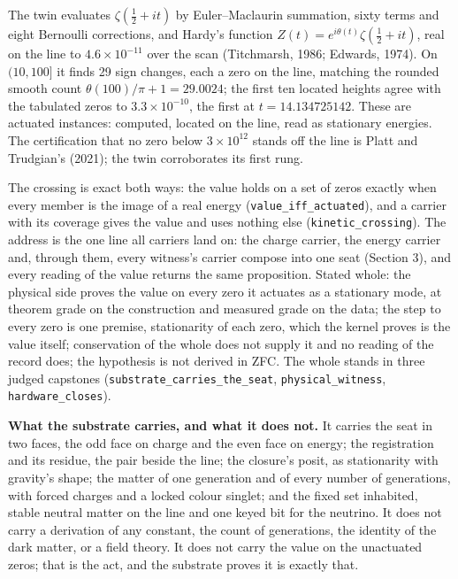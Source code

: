 \documentclass[10pt]{article}
\begin{document}
The twin evaluates \(\zeta(\tfrac12+it)\) by Euler--Maclaurin summation,
sixty terms and eight Bernoulli corrections, and Hardy's function
\(Z(t)=e^{i\theta(t)}\zeta(\tfrac12+it)\), real on the line to
\(4.6\times10^{-11}\) over the scan (Titchmarsh, 1986; Edwards, 1974).
On \((10,100]\) it finds 29 sign changes, each a zero on the line,
matching the rounded smooth count \(\theta(100)/\pi+1=29.0024\); the
first ten located heights agree with the tabulated zeros to
\(3.3\times10^{-10}\), the first at \(t=14.134725142\). These are
actuated instances: computed, located on the line, read as stationary
energies. The certification that no zero below \(3\times10^{12}\) stands
off the line is Platt and Trudgian's (2021); the twin corroborates its
first rung.

The crossing is exact both ways: the value holds on a set of zeros
exactly when every member is the image of a real energy
(\texttt{value\_iff\_actuated}), and a carrier with its coverage gives
the value and uses nothing else (\texttt{kinetic\_crossing}). The
address is the one line all carriers land on: the charge carrier, the
energy carrier and, through them, every witness's carrier compose into
one seat (Section 3), and every reading of the value returns the same
proposition. Stated whole: the physical side proves the value on every
zero it actuates as a stationary mode, at theorem grade on the
construction and measured grade on the data; the step to every zero is
one premise, stationarity of each zero, which the kernel proves is the
value itself; conservation of the whole does not supply it and no
reading of the record does; the hypothesis is not derived in ZFC. The
whole stands in three judged capstones
(\texttt{substrate\_carries\_the\_seat}, \texttt{physical\_witness},
\texttt{hardware\_closes}).

\textbf{What the substrate carries, and what it does not.} It carries
the seat in two faces, the odd face on charge and the even face on
energy; the registration and its residue, the pair beside the line; the
closure's posit, as stationarity with gravity's shape; the matter of one
generation and of every number of generations, with forced charges and a
locked colour singlet; and the fixed set inhabited, stable neutral
matter on the line and one keyed bit for the neutrino. It does not carry
a derivation of any constant, the count of generations, the identity of
the dark matter, or a field theory. It does not carry the value on the
unactuated zeros; that is the act, and the substrate proves it is
exactly that.
\end{document}
